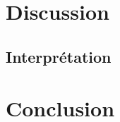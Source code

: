 \documentclass[a4paper,12pt,oneside]{article}
\begin{document}
\section{Discussion}%

\subsection{Interprétation}

\section{Conclusion}






\begin{thebibliography}{99}
\end{thebibliography}
\end{document}
